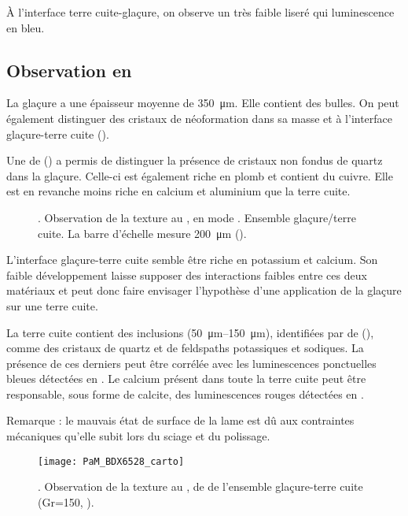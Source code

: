 À l'interface terre cuite-glaçure, on observe un très faible liseré 
qui luminescence en bleu.

\subsection{Observation en \MEB[ie]}
La glaçure a une épaisseur moyenne de \SI{350}{\um}. Elle contient des 
bulles. On peut également distinguer des cristaux de néoformation dans 
sa masse et à l'interface glaçure-terre cuite 
().

Une \carto de \RX () a permis de distinguer 
la présence de cristaux non fondus de quartz dans la glaçure. Celle-ci 
est également riche en plomb et contient du cuivre. Elle est en 
revanche moins riche en calcium et aluminium que la terre cuite.

\begin{figure}[p]
  \caption[\ -- Observation de la texture au \MEB, 
           en mode \ERD. Ensemble glaçure/terre cuite]
          {\legendeA.
           Observation de la texture au \MEB, en mode \ERD. 
           Ensemble glaçure/terre cuite. La barre d'échelle mesure 
           \SI{200}{\um} ().}
  \label{MEB:6528_img}
\end{figure}

L'interface glaçure-terre cuite semble être riche en potassium et 
calcium. Son faible développement laisse supposer des interactions 
faibles entre ces deux matériaux  et peut donc faire envisager 
l'hypothèse d'une application de la glaçure sur une terre cuite.

La terre cuite contient des inclusions 
(\SIrange[range-phrase=\ à\ ]{50}{150}{\um}), identifiées par \carto 
de \RX (), comme des cristaux de quartz et de 
feldspaths potassiques et sodiques. La présence de ces derniers peut 
être corrélée avec les luminescences ponctuelles bleues détectées en 
\CL. Le calcium présent dans toute la terre cuite peut être 
responsable, sous forme de calcite, des luminescences rouges détectées 
en \CL.

\noindent Remarque : le mauvais état de surface de la lame est dû aux 
contraintes mécaniques qu'elle subit lors du sciage et du polissage.

\begin{figure}[p]
  \texttt{[image: PaM\_BDX6528\_carto]}%
  \caption[\ -- Observation de la texture au \MEB, 
           \carto de \RX de l'ensemble glaçure-terre cuite]
          {\legendeA.
           Observation de la texture au \MEB, 
           \carto de \RX de l'ensemble glaçure-terre cuite 
           (Gr=150, ).}
  \label{MEB:6528_carto_tcgla}
\end{figure}

